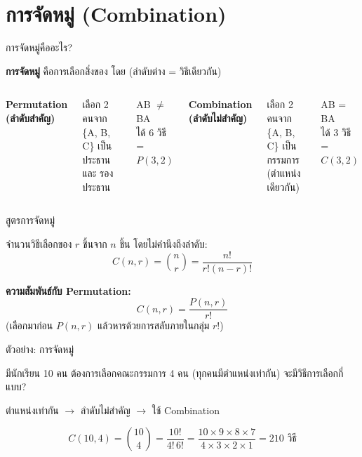 \documentclass[11pt, aspectratio=169]{beamer}
\begin{document}
\section{การจัดหมู่ (Combination)}

\begin{frame}{การจัดหมู่คืออะไร?}
  \begin{explanation}
    \textbf{การจัดหมู่} คือการเลือกสิ่งของ โดย 
    (ลำดับต่าง = วิธีเดียวกัน)
  \end{explanation}

  \begin{columns}[T]
      \centering
      \textbf{Permutation (ลำดับสำคัญ)}

      \medskip
      เลือก 2 คนจาก \{A, B, C\} เป็น\\
      ประธาน และ รองประธาน

      \medskip
      AB $\neq$ BA \\
      ได้ 6 วิธี = $P(3,2)$

      \centering
      \textbf{Combination (ลำดับไม่สำคัญ)}

      \medskip
      เลือก 2 คนจาก \{A, B, C\} เป็น\\
      กรรมการ (ตำแหน่งเดียวกัน)

      \medskip
      AB = BA \\
      ได้ 3 วิธี = $C(3,2)$
  \end{columns}
\end{frame}

\begin{frame}{สูตรการจัดหมู่}
  \begin{explanation}[สูตร]
    จำนวนวิธีเลือกของ $r$ ชิ้นจาก $n$ ชิ้น โดยไม่คำนึงถึงลำดับ:
    \[
      C(n, r) = \binom{n}{r} = \frac{n!}{r!(n-r)!}
    \]

    \medskip
    \textbf{ความสัมพันธ์กับ Permutation:}
    \[
      C(n, r) = \frac{P(n, r)}{r!}
    \]
    (เลือกมาก่อน $P(n,r)$ แล้วหารด้วยการสลับภายในกลุ่ม $r!$)
  \end{explanation}
\end{frame}

\begin{frame}{ตัวอย่าง: การจัดหมู่}
  \begin{exambox}
    มีนักเรียน 10 คน ต้องการเลือกคณะกรรมการ 4 คน
    (ทุกคนมีตำแหน่งเท่ากัน) จะมีวิธีการเลือกกี่แบบ?
  \end{exambox}

  \begin{solbox}[วิธีทำ]
    ตำแหน่งเท่ากัน $\rightarrow$ ลำดับไม่สำคัญ $\rightarrow$ ใช้ Combination

    \[
      C(10, 4) = \binom{10}{4} = \frac{10!}{4! \, 6!}
      = \frac{10 \times 9 \times 8 \times 7}{4 \times 3 \times 2 \times 1}
      = 210 \text{ วิธี}
    \]
  \end{solbox}
\end{frame}
\end{document}
